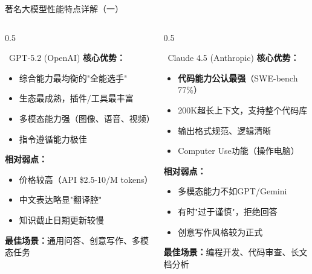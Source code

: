 \documentclass[aspectratio=169,11pt]{beamer}
\begin{document}
\begin{frame}{著名大模型性能特点详解（一）}
    \begin{columns}
        \begin{column}{0.5\textwidth}
            \begin{block}{\textcolor{openaigreen}{\faRobot\ GPT-5.2 (OpenAI)}}
                \textbf{核心优势：}
                \begin{itemize}
                    \item 综合能力最均衡的"全能选手"
                    \item 生态最成熟，插件/工具最丰富
                    \item 多模态能力强（图像、语音、视频）
                    \item 指令遵循能力极佳
                \end{itemize}
                \textbf{相对弱点：}
                \begin{itemize}
                    \item 价格较高（API \$2.5-10/M tokens）
                    \item 中文表达略显"翻译腔"
                    \item 知识截止日期更新较慢
                \end{itemize}
                \textbf{最佳场景：}通用问答、创意写作、多模态任务
            \end{block}
        \end{column}
        \begin{column}{0.5\textwidth}
            \begin{block}{\textcolor{anthropicred}{\faComment\ Claude 4.5 (Anthropic)}}
                \textbf{核心优势：}
                \begin{itemize}
                    \item \textbf{代码能力公认最强}（SWE-bench 77\%）
                    \item 200K超长上下文，支持整个代码库
                    \item 输出格式规范、逻辑清晰
                    \item Computer Use功能（操作电脑）
                \end{itemize}
                \textbf{相对弱点：}
                \begin{itemize}
                    \item 多模态能力不如GPT/Gemini
                    \item 有时"过于谨慎"，拒绝回答
                    \item 创意写作风格较为正式
                \end{itemize}
                \textbf{最佳场景：}编程开发、代码审查、长文档分析
            \end{block}
        \end{column}
    \end{columns}
\end{frame}
\end{document}
